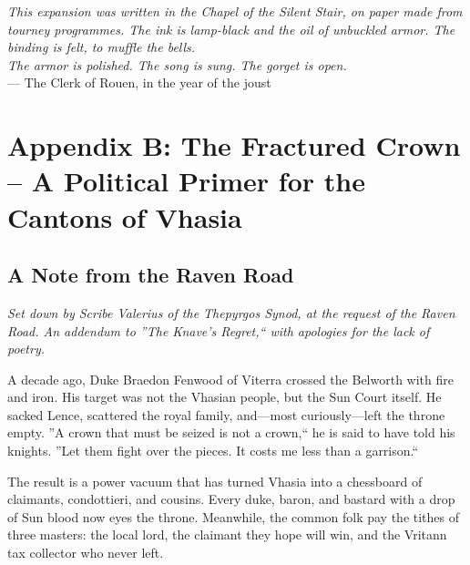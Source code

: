 \documentclass[11pt,twoside]{book}
\begin{document}
\newpage
\thispagestyle{empty}
\vspace*{\fill}
\begin{center}
\textit{This expansion was written in the Chapel of the Silent Stair, on paper made from tourney programmes.  The ink is lamp-black and the oil of unbuckled armor.  The binding is felt, to muffle the bells.}\\[1em]

\textit{The armor is polished.  The song is sung.  The gorget is open.}\\[2em]

--- The Clerk of Rouen, in the year of the joust
\end{center}
\vspace*{\fill}

\chapter*{Appendix B: The Fractured Crown -- A Political Primer for the Cantons of Vhasia}

\section*{A Note from the Raven Road}

\textit{Set down by Scribe Valerius of the Thepyrgos Synod, at the request of the Raven Road. An addendum to ''The Knave's Regret,`` with apologies for the lack of poetry.}

A decade ago, Duke Braedon Fenwood of Viterra crossed the Belworth with fire and iron. His target was not the Vhasian people, but the Sun Court itself. He sacked Lence, scattered the royal family, and---most curiously---left the throne empty. ''A crown that must be seized is not a crown,`` he is said to have told his knights. ''Let them fight over the pieces. It costs me less than a garrison.``

The result is a power vacuum that has turned Vhasia into a chessboard of claimants, condottieri, and cousins. Every duke, baron, and bastard with a drop of Sun blood now eyes the throne. Meanwhile, the common folk pay the tithes of three masters: the local lord, the claimant they hope will win, and the Vritann tax collector who never left.
\end{document}

